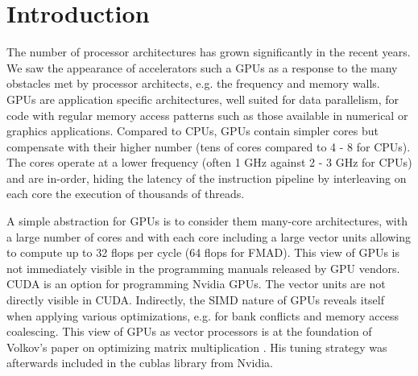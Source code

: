\section{Introduction}
The number of processor architectures has grown significantly in the recent
years. We saw the appearance of accelerators such a GPUs as a response to the
many obstacles met by processor architects, e.g. the frequency and memory walls.
GPUs are application specific architectures, well suited for data parallelism,
for code with regular memory access patterns such as those available in
numerical or graphics applications. Compared to CPUs, GPUs contain simpler cores
but compensate with their higher number (tens of cores compared to 4 - 8 for
CPUs). The cores operate at a lower frequency (often 1 GHz against 2 - 3 GHz for
CPUs) and are in-order, hiding the latency of the instruction pipeline by
interleaving on each core the execution of thousands of threads.

A simple abstraction for GPUs is to consider them many-core architectures, with
a large number of cores and with each core including a large vector units
allowing to compute up to 32 flops per cycle (64 flops for FMAD). This view of
GPUs is not immediately visible in the programming manuals released by GPU
vendors. CUDA is an option for programming Nvidia GPUs. The vector units are not
directly visible in CUDA. Indirectly, the SIMD nature of GPUs reveals itself
when applying various optimizations, e.g. for bank conflicts and memory access
coalescing. This view of GPUs as vector processors is at the foundation of
Volkov's paper on optimizing matrix multiplication \cite{volkov2008}. His tuning
strategy was afterwards included in the cublas library from Nvidia.


